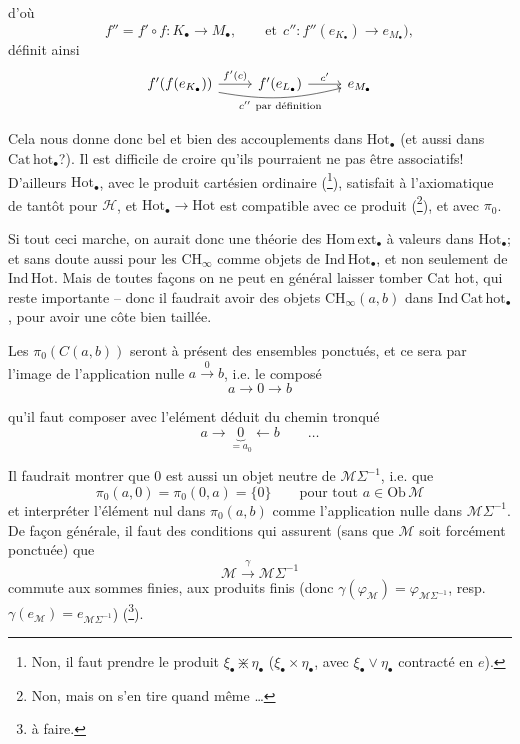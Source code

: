 \documentclass[11pt]{article}
\newcommand{\printedpage}[1]{\marginpar{\footnotesize p.~#1}}
\newcommand{\msp}[1]{\marginpar{\footnotesize [#1]}}
\newcommand{\Hot}{\mathrm{Hot}}
\newcommand{\M}{\mathcal{M}}
\newcommand{\Homext}{\mathrm{Hom\,ext}}
\begin{document}
\msp{page 17}

d'où
\[
f'' = f'\circ f : K_{\bullet} \longrightarrow M_{\bullet}, \qquad \text{et}\ \ c'' : f''(e_{K_{\bullet}}) \longrightarrow e_{M_{\bullet}}), %
\]
définit ainsi
\[
\begin{tikzcd}
f'(f(e_{K_{\bullet}})) \arrow[r, "f'(c)"] \arrow[rr, bend right=12, "{c''\ \text{par définition}}"'] & f'(e_{L_{\bullet}}) \arrow[r, "c'"] & e_{M_{\bullet}}
\end{tikzcd}
\]

\noindent{}Cela nous donne donc bel et bien des accouplements dans $\Hot_{\bullet}$ (et aussi dans $\mathrm{Cat\,hot}_{\bullet}$?). Il est difficile de croire qu'ils pourraient ne pas être associatifs! D'ailleurs $\Hot_{\bullet}$, avec le produit cartésien ordinaire (\footnote[4]{Non, il faut prendre le produit $\xi_{\bullet} \divideontimes \eta_{\bullet}$ ($\xi_{\bullet}\times\eta_{\bullet}$, avec $\xi_{\bullet}\vee\eta_{\bullet}$ contracté en $e$).}), satisfait à l'axiomatique de tantôt pour $\mathcal{H}$, et $\Hot_{\bullet} \longrightarrow \Hot$ est compatible avec ce produit (\footnote[5]{Non, mais on s'en tire quand même \ldots}), et avec $\pi_0$. %

Si tout ceci marche, on aurait donc une théorie des $\Homext_{\bullet}$ à valeurs dans $\Hot_{\bullet}$; et sans doute aussi pour les $\mathrm{CH}_{\infty}$ comme objets de $\mathrm{Ind\,Hot}_{\bullet}$, et non seulement de $\mathrm{Ind\,Hot}$. Mais
\printedpage{11}
de toutes façons on ne peut en général laisser tomber Cat hot, qui reste importante -- donc il faudrait avoir des objets $\mathrm{CH}_{\infty}(a,b)$ dans $\mathrm{Ind\,Cat\,hot}_{\bullet}$, pour avoir une côte bien taillée.

Les $\pi_0(C(a,b))$ seront à présent des ensembles ponctués, et ce sera par l'image de l'application nulle $a \xrightarrow{\ 0\ } b$, i.e. le composé
\[
a \longrightarrow 0 \longrightarrow b
\]

\msp{page 18}

qu'il faut composer avec l'elément déduit du chemin tronqué %
\[
a \longrightarrow \underbrace{0}_{=a_0} \longleftarrow b \qquad \ldots
\]

Il faudrait montrer que 0 est aussi un objet neutre de $\M\Sigma^{-1}$, i.e. que
\[
\pi_0(a,0) = \pi_0(0,a) = \{0\} \qquad \text{pour tout } a \in \mathrm{Ob}\,\M
\]
et interpréter l'élément nul dans $\pi_0(a,b)$ comme l'application nulle dans $\M\Sigma^{-1}$. De façon générale, il faut des conditions qui assurent (sans que $\M$ soit forcément ponctuée) que
\[
\M \xrightarrow{\ \gamma\ } \M\Sigma^{-1}
\]
commute aux sommes finies, aux produits finis (donc $\gamma(\varphi_{\M}) = \varphi_{\M\Sigma^{-1}}$, resp. $\gamma(e_{\M}) = e_{\M\Sigma^{-1}}$) (\footnote[6]{à faire.}).
\end{document}
